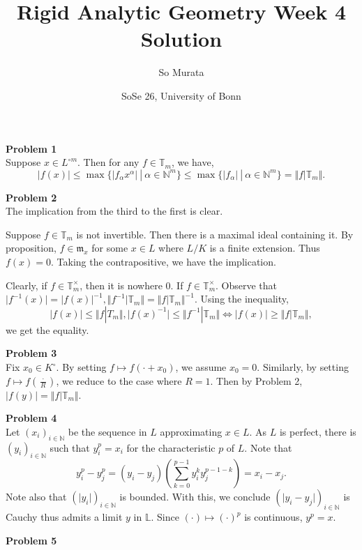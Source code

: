 \documentclass[10pt]{article}
\title{Rigid Analytic Geometry Week 4 Solution}
\author{So Murata}
\date{SoSe 26, University of Bonn}
\newcommand{\norm}[1]{\Vert #1 \Vert}
\newcommand{\N}[0]{\mathbb{N}}
\newcommand{\m}[0]{\mathfrak{m}}
\newcommand{\T}[0]{\mathbb{T}}
\newcommand{\sep}[0]{\:|\:}
\newcommand{\ab}[1]{\vert #1 \vert}
\begin{document}
\maketitle

\par\textbf{Problem 1}\\
Suppose $x\in L^{\circ m}$. Then for any $f\in \T_m$, we have,
\begin{equation*}
    \ab{f(x)} \leq \max\{\ab{f_\alpha x^\alpha}\sep \alpha\in\N^m\} \leq \max\{\ab{f_\alpha}\sep \alpha\in\N^m\} = \norm{f|\T_m}.
\end{equation*}
\par\textbf{Problem 2}\\
The implication from the third to the first is clear.
\par Suppose $f\in\T_m$ is not invertible. Then there is a maximal ideal containing it. By proposition, $f\in\m_x$ for some $x\in L$ where $L/K$ is a finite extension. Thus $f(x) = 0$. Taking the contrapositive, we have the implication.
\par Clearly, if $f\in\T_m^\times$, then it is nowhere $0$. If $f\in\T_m^\times$. Observe that $\ab{f^{-1}(x)} = \ab{f(x)}^{-1},\norm{f^{-1}|\T_m} = \norm{f|\T_m}^{-1}$. Using the inequality, 
\begin{equation*}
    \ab{f(x)}\leq\norm{f|T_m},\ab{f(x)^{-1}}\leq \norm{f^{-1}|\T_m}\iff \ab{f(x)}\geq\norm{f|\T_m},
\end{equation*}
we get the equality.
\par\textbf{Problem 3}\\
Fix $x_0\in K^\circ$. By setting $f\mapsto f(\cdot+x_0)$, we assume $x_0=0$. Similarly, by setting $f\mapsto f\left({\frac {\cdot} R}\right)$, we reduce to the case where $R=1$. Then by Problem 2, $\vert f(y)\vert = \norm{f|\T_m}$.
\par\textbf{Problem 4}\\
Let $(x_i)_{i\in\N}$ be the sequence in $L$ approximating $x\in L$. As $L$ is perfect, there is $(y_i)_{i\in\N}$ such that $y_i^p = x_i$ for the characteristic $p$ of $L$. Note that 
\begin{equation*}
    y_i^p-y_j^p = (y_i-y_j)\left(\sum_{k=0}^{p-1}y_i^ky_j^{p-1-k}\right) = x_i-x_j.
\end{equation*}
Note also that $(\ab{y_i})_{i\in\N}$ is bounded. With this, we conclude $(\vert y_i-y_j\vert)_{i\in\N}$ is Cauchy thus admits a limit $y$ in $\mathbb{L}$. Since $(\cdot)\mapsto(\cdot)^p$ is continuous, $y^p = x$.
\par\textbf{Problem 5}\\
\end{document}
